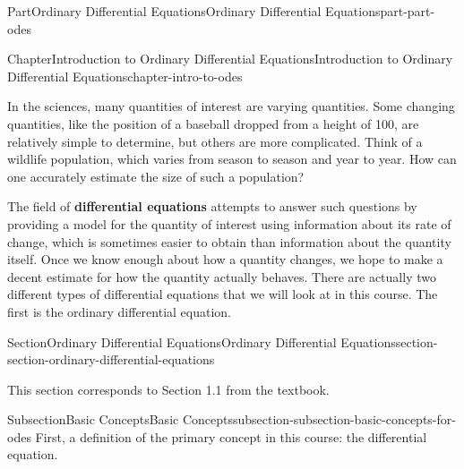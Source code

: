 \documentclass[twoside,10pt,]{book}
\newcommand{\terminology}[1]{\textbf{#1}}
\numberwithin{equation}{part}
\begin{document}
\begin{partptx}{Part}{Ordinary Differential Equations}{}{Ordinary Differential Equations}{}{}{part-part-odes}
\renewcommand*{\partname}{Part}
%
\typeout{************************************************}
\typeout{************************************************}
%
\begin{chapterptx}{Chapter}{Introduction to Ordinary Differential Equations}{}{Introduction to Ordinary Differential Equations}{}{}{chapter-intro-to-odes}
\renewcommand*{\chaptername}{Chapter}
\begin{introduction}{}%
In the sciences, many quantities of interest are varying quantities. Some changing quantities, like the position of a baseball dropped from a height of \SI{100}{\foot}, are relatively simple to determine, but others are more complicated. Think of a wildlife population, which varies from season to season and year to year. How can one accurately estimate the size of such a population?%
\par
The field of \terminology{differential equations} attempts to answer such questions by providing a model for the quantity of interest using information about its rate of change, which is sometimes easier to obtain than information about the quantity itself. Once we know enough about how a quantity changes, we hope to make a decent estimate for how the quantity actually behaves. There are actually two different types of differential equations that we will look at in this course. The first is the ordinary differential equation.%
\end{introduction}%
%
%
\typeout{************************************************}
\typeout{************************************************}
%
\begin{sectionptx}{Section}{Ordinary Differential Equations}{}{Ordinary Differential Equations}{}{}{section-section-ordinary-differential-equations}
\begin{introduction}{}%
This section corresponds to Section 1.1 from the textbook.%
\end{introduction}%
%
%
\typeout{************************************************}
\typeout{************************************************}
%
\begin{subsectionptx}{Subsection}{Basic Concepts}{}{Basic Concepts}{}{}{subsection-subsection-basic-concepts-for-odes}
First, a definition of the primary concept in this course: the differential equation.%

\end{subsectionptx}
\end{sectionptx}
\end{chapterptx}
\end{partptx}
\end{document}
